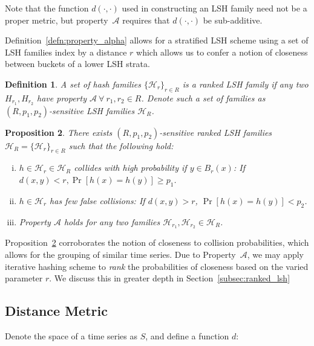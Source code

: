 \documentclass[a4paper]{article}
\newtheorem{definition}{Definition}
\newtheorem{proposition}[definition]{Proposition}
\begin{document}
Note that the function $d(\cdot,\cdot)$ used in constructing an LSH family need not be a proper metric, but property~$\mathscr{A}$ requires that $d(\cdot,\cdot)$ be sub-additive.

Definition~\ref{defn:property_alpha} allows for a stratified LSH scheme using a set of LSH families index by a distance $r$ which allows us to confer a notion of closeness between buckets of a lower LSH strata.

\begin{definition}\label{defn:ranked_lsh}
    A set of hash families ${\{\mathcal{H}_r\}}_{r\in R}$ is a ranked LSH family if any two $H_{r_1}, H_{r_2}$ have property $\mathscr{A}~\forall~r_1, r_2 \in R$.
    Denote such a set of families as $(R,p_1, p_2)$-sensitive LSH families $\mathcal{H}_R$.
\end{definition}

\begin{proposition}\label{prop:ranked_lsh}
    There exists $(R, p_1, p_2)$-sensitive ranked LSH families $\mathcal{H}_R = {\{\mathcal{H}_r\}}_{r\in R}$ such that the following hold:
    \begin{enumerate}[(i)]
        \item\label{itm:first}
            $h \in \mathcal{H}_r \in \mathcal{H}_R$ collides with high probability if $y \in B_r(x)$: If $d(x,y) < r, \Pr[h(x) = h(y)] \ge p_1$.
        \item\label{itm:second}
            $h \in \mathcal{H}_r$ has few false collisions: If $d(x,y) > r$, $\Pr[h(x) = h(y)] < p_2$.
        \item\label{itm:rank_property}
            Property $\mathscr{A}$ holds for any two families $\mathcal{H}_{r_1}, \mathcal{H}_{r_2} \in \mathcal{H}_R$.
    \end{enumerate}
\end{proposition}

Proposition~\ref{prop:ranked_lsh} corroborates the notion of closeness to collision probabilities, which allows for the grouping of similar time series.
Due to Property~$\mathscr{A}$, we may apply iterative hashing scheme to \textit{rank} the probabilities of closeness based on the varied parameter $r$.
We discuss this in greater depth in Section~\ref{subsec:ranked_lsh}

\subsection{Distance Metric}
Denote the space of a time series as $S$, and define a function $d$:
\end{document}
